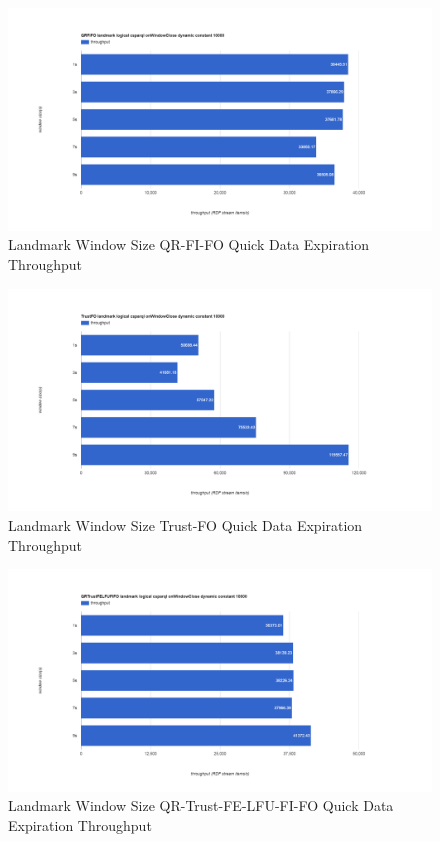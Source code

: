 \begin{figure}[!htbp]
	\centering
    \includegraphics[width=\textwidth]{img/app3-land-ws-qrfifo-quick-t.png}
    \caption{Landmark Window Size QR-FI-FO Quick Data Expiration Throughput}
\end{figure}
\begin{figure}[!htbp]
	\centering
    \includegraphics[width=\textwidth]{img/app3-land-ws-trustfo-quick-t.png}
    \caption{Landmark Window Size Trust-FO Quick Data Expiration Throughput}
\end{figure}
\begin{figure}[!htbp]
	\centering
    \includegraphics[width=\textwidth]{img/app3-land-ws-qrtrustfelfufifo-quick-t.png}
    \caption{Landmark Window Size QR-Trust-FE-LFU-FI-FO Quick Data Expiration Throughput}
\end{figure}
